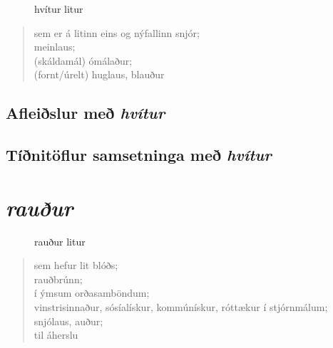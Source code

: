 \documentclass[12pt,b5paper,twosided,openany]{book}
\begin{document}
\begin{figure}[H]
\begin{tcolorbox}
	\centering
\end{tcolorbox}
	\caption{hvítur litur}
	\label{mynd:hvitt}
\end{figure}

\begin{quote}
	sem er á litinn eins og nýfallinn snjór; \\
	meinlaus; \\
	(skáldamál) ómálaður;\\
	(fornt/úrelt) huglaus, blauður \\
\end{quote}
\clearpage

\section{Afleiðslur með \textit{hvítur}}
\label{afl:hvitafl}


\section{Tíðnitöflur samsetninga með \textit{hvítur}}
\label{tidni:hvitid}


\chapter{\textit{rauður}}
\label{kafli:raudur}

\begin{figure}[H]
\begin{tcolorbox}
	\centering
\end{tcolorbox}
	\caption{rauður litur}
	\label{mynd:rautt}
\end{figure}

\begin{quote}
	sem hefur lit blóðs; \\
	rauðbrúnn; \\
	í ýmsum orðasamböndum; \\
	vinstrisinnaður, sósíalískur, kommúnískur, róttækur í stjórnmálum; \\
	snjólaus, auður; \\
	til áherslu
\end{quote}
\clearpage
\end{document}
